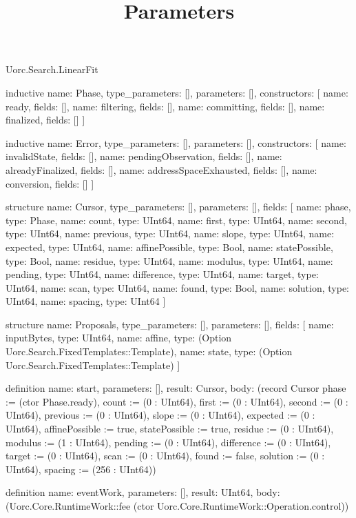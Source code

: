 \begin{lexlean}{Uorc.Search.LinearFit}
\title{Parameters}
\begin{semanticmodule}
inductive{
  name: Phase,
  type_parameters: [],
  parameters: [],
  constructors: [
    {name: ready, fields: []},
    {name: filtering, fields: []},
    {name: committing, fields: []},
    {name: finalized, fields: []}
  ]
}

inductive{
  name: Error,
  type_parameters: [],
  parameters: [],
  constructors: [
    {name: invalidState, fields: []},
    {name: pendingObservation, fields: []},
    {name: alreadyFinalized, fields: []},
    {name: addressSpaceExhausted, fields: []},
    {name: conversion, fields: []}
  ]
}

structure{
  name: Cursor,
  type_parameters: [],
  parameters: [],
  fields: [
    {name: phase, type: Phase},
    {name: count, type: UInt64},
    {name: first, type: UInt64},
    {name: second, type: UInt64},
    {name: previous, type: UInt64},
    {name: slope, type: UInt64},
    {name: expected, type: UInt64},
    {name: affinePossible, type: Bool},
    {name: statePossible, type: Bool},
    {name: residue, type: UInt64},
    {name: modulus, type: UInt64},
    {name: pending, type: UInt64},
    {name: difference, type: UInt64},
    {name: target, type: UInt64},
    {name: scan, type: UInt64},
    {name: found, type: Bool},
    {name: solution, type: UInt64},
    {name: spacing, type: UInt64}
  ]
}

structure{
  name: Proposals,
  type_parameters: [],
  parameters: [],
  fields: [
    {name: inputBytes, type: UInt64},
    {name: affine, type: (Option Uorc.Search.FixedTemplates::Template)},
    {name: state, type: (Option Uorc.Search.FixedTemplates::Template)}
  ]
}

definition{
  name: start,
  parameters: [],
  result: Cursor,
  body: (record Cursor {phase := (ctor Phase.ready), count := (0 : UInt64), first := (0 : UInt64), second := (0 : UInt64), previous := (0 : UInt64), slope := (0 : UInt64), expected := (0 : UInt64), affinePossible := true, statePossible := true, residue := (0 : UInt64), modulus := (1 : UInt64), pending := (0 : UInt64), difference := (0 : UInt64), target := (0 : UInt64), scan := (0 : UInt64), found := false, solution := (0 : UInt64), spacing := (256 : UInt64)})
}

definition{
  name: eventWork,
  parameters: [],
  result: UInt64,
  body: (Uorc.Core.RuntimeWork::fee (ctor Uorc.Core.RuntimeWork::Operation.control))
}


\end{semanticmodule}
\end{lexlean}

